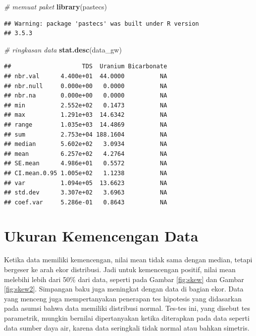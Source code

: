 \documentclass[]{book}
\newenvironment{Shaded}{\begin{snugshade}}{\end{snugshade}}
\newcommand{\KeywordTok}[1]{\textcolor[rgb]{0.13,0.29,0.53}{\textbf{#1}}}
\newcommand{\CommentTok}[1]{\textcolor[rgb]{0.56,0.35,0.01}{\textit{#1}}}
\newcommand{\NormalTok}[1]{#1}
\begin{document}
\begin{Shaded}
\begin{Highlighting}[]
\CommentTok{# memuat paket}
\KeywordTok{library}\NormalTok{(pastecs)}
\end{Highlighting}
\end{Shaded}

\begin{verbatim}
## Warning: package 'pastecs' was built under R version
## 3.5.3
\end{verbatim}

\begin{Shaded}
\begin{Highlighting}[]
\CommentTok{# ringkasan data}
\KeywordTok{stat.desc}\NormalTok{(data_gw)}
\end{Highlighting}
\end{Shaded}

\begin{verbatim}
##                    TDS  Uranium Bicarbonate
## nbr.val      4.400e+01  44.0000          NA
## nbr.null     0.000e+00   0.0000          NA
## nbr.na       0.000e+00   0.0000          NA
## min          2.552e+02   0.1473          NA
## max          1.291e+03  14.6342          NA
## range        1.035e+03  14.4869          NA
## sum          2.753e+04 188.1604          NA
## median       5.602e+02   3.0934          NA
## mean         6.257e+02   4.2764          NA
## SE.mean      4.986e+01   0.5572          NA
## CI.mean.0.95 1.005e+02   1.1238          NA
## var          1.094e+05  13.6623          NA
## std.dev      3.307e+02   3.6963          NA
## coef.var     5.286e-01   0.8643          NA
\end{verbatim}

\section{Ukuran Kemencengan Data}\label{ukuran-kemencengan-data}

Ketika data memiliki kemencengan, nilai mean tidak sama dengan median,
tetapi bergeser ke arah ekor distribusi. Jadi untuk kemencengan positif,
nilai mean melebihi lebih dari 50\% dari data, seperti pada Gambar
\ref{fig:skew} dan Gambar \ref{fig:skew2}. Simpangan baku juga meningkat
dengan data di bagian ekor. Data yang menceng juga mempertanyakan
penerapan tes hipotesis yang didasarkan pada asumsi bahwa data memiliki
distribusi normal. Tes-tes ini, yang disebut tes parametrik, mungkin
bernilai dipertanyakan ketika diterapkan pada data seperti data sumber
daya air, karena data seringkali tidak normal atau bahkan simetris.
\end{document}

